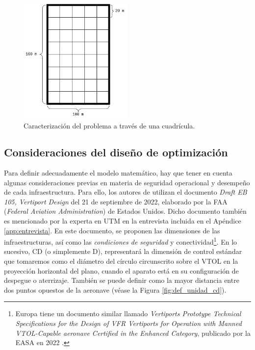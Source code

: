 \documentclass[12pt,a4paper]{book}
\begin{document}
\begin{figure}[h]
    \begin{center}
    \includegraphics[width=0.5\textwidth]{img/cuad_dim_empty.png}
    \end{center}
    \caption{Caracterización del problema a través de una cuadrícula.}
    \label{fig:cuad_dim_empty}
\end{figure} 

\subsection{Consideraciones del diseño de optimización}
Para definir adecuadamente el modelo matemático, hay que tener en cuenta algunas consideraciones previas en materia de seguridad operacional y desempeño de cada infraestructura. Para ello, los autores de \cite{federal_aviation_administration_vertiport_2022} utilizan el documento \textsl{Draft EB 105, Vertiport Design} del 21 de septiembre de 2022,  elaborado por la FAA (\textsl{Federal Aviation Administration}) de Estados Unidos. Dicho documento también es mencionado por la experta en UTM en la entrevista incluida en el Apéndice \ref{app:entrevista}. En este documento, se proponen las dimensiones de las infraestructuras, así como las \textsl{condiciones de seguridad} y conectividad\footnote{Europa tiene un documento similar llamado \textsl{Vertiports Prototype Technical Specifications for the Design of VFR Vertiports for Operation with Manned VTOL-Capable aeronave Certified in the Enhanced Category}, publicado por la EASA en 2022 \cite{easa_vertiports_2022}.}. En lo sucesivo, CD (o simplemente D), representará la dimensión de control estándar que tomaremos como el diámetro del círculo circunscrito sobre el VTOL en la proyección horizontal del plano, cuando el aparato está en su configuración de despegue o aterrizaje. También se puede definir como la mayor distancia entre dos puntos opuestos de la aeronave (véase la Figura \ref{fig:def_unidad_cd}). 
\end{document}
